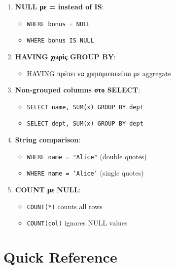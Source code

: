 \begin{warningbox}
\begin{enumerate}
    \item \textbf{NULL με = instead of IS}:
    \begin{itemize}
        \item[$\times$] \texttt{WHERE bonus = NULL}
        \item[\checkmark] \texttt{WHERE bonus IS NULL}
    \end{itemize}

    \item \textbf{HAVING χωρίς GROUP BY}:
    \begin{itemize}
        \item HAVING πρέπει να χρησιμοποιείται με aggregate
    \end{itemize}

    \item \textbf{Non-grouped columns στο SELECT}:
    \begin{itemize}
        \item[$\times$] \texttt{SELECT name, SUM(x) GROUP BY dept}
        \item[\checkmark] \texttt{SELECT dept, SUM(x) GROUP BY dept}
    \end{itemize}

    \item \textbf{String comparison}:
    \begin{itemize}
        \item[$\times$] \texttt{WHERE name = "Alice"} (double quotes)
        \item[\checkmark] \texttt{WHERE name = 'Alice'} (single quotes)
    \end{itemize}

    \item \textbf{COUNT με NULL}:
    \begin{itemize}
        \item \texttt{COUNT(*)} counts all rows
        \item \texttt{COUNT(col)} ignores NULL values
    \end{itemize}
\end{enumerate}
\end{warningbox}

\section{Quick Reference}

